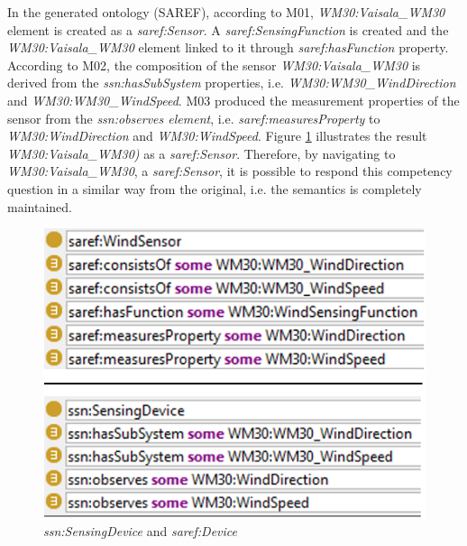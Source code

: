 \documentclass{sig-alternate-05-2015}
\begin{document}
In the generated ontology (SAREF), according to M01, \textit{WM30:\-Vaisala\-\_WM30} element is created as a \textit{saref:\-Sensor}. A \textit{saref:\-SensingFunction} is created and the \textit{WM30:\-Vaisala\-\_WM30} element linked to it through \textit{saref:\-hasFunction} property. According to M02, the composition of the sensor \textit{WM30:\-Vaisala\-\_WM30} is derived from the \textit{ssn:\-hasSubSystem} properties, i.e. \textit{WM30:\-WM30\-\_Wind\-Direction} and \textit{WM30:\-WM30\-\_WindSpeed}. M03 produced the measurement properties of the sensor from the \textit{ssn:\-observes element}, i.e. \textit{saref:\-measuresProperty} to \textit{WM30:\-WindDirection} and \textit{WM30:\-WindSpeed}. Figure \ref{fig:SAREF_Sensor_WM30} illustrates the result \textit{WM30:\-Vaisala\-\_WM30)} as a \textit{saref:\-Sensor}. Therefore, by navigating to \textit{WM30:\-Vaisala\-\_WM30}, a \textit{saref:\-Sensor}, it is possible to respond this competency question in a similar way from the original, i.e. the semantics is completely maintained.  
\begin{figure}[h!]
\centering
\includegraphics[scale=0.53]{WM30_SSNtoSAREF}
\caption{\textit{ssn:SensingDevice} and \textit{saref:Device}}
\label{fig:SAREF_Sensor_WM30}
\end{figure}
\end{document}
